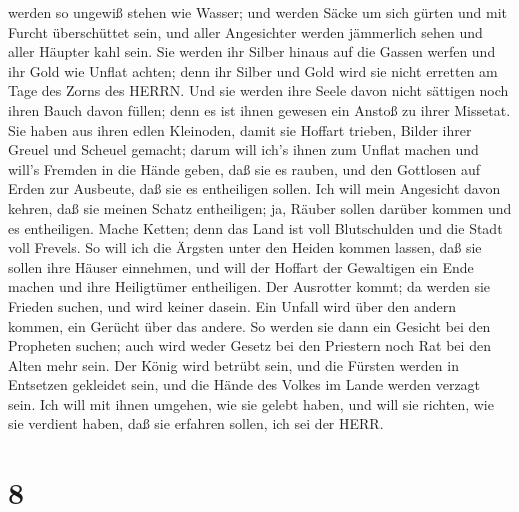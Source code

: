 werden so ungewiß stehen wie Wasser;  und werden Säcke um
sich gürten und mit Furcht überschüttet sein, und aller Angesichter
werden jämmerlich sehen und aller Häupter kahl sein.  Sie
werden ihr Silber hinaus auf die Gassen werfen und ihr Gold wie Unflat
achten; denn ihr Silber und Gold wird sie nicht erretten am Tage des
Zorns des HERRN. Und sie werden ihre Seele davon nicht sättigen noch
ihren Bauch davon füllen; denn es ist ihnen gewesen ein Anstoß zu ihrer
Missetat.  Sie haben aus ihren edlen Kleinoden, damit sie
Hoffart trieben, Bilder ihrer Greuel und Scheuel gemacht; darum will
ich's ihnen zum Unflat machen  und will's Fremden in die
Hände geben, daß sie es rauben, und den Gottlosen auf Erden zur
Ausbeute, daß sie es entheiligen sollen.  Ich will mein
Angesicht davon kehren, daß sie meinen Schatz entheiligen; ja, Räuber
sollen darüber kommen und es entheiligen.  Mache Ketten;
denn das Land ist voll Blutschulden und die Stadt voll Frevels.
 So will ich die Ärgsten unter den Heiden kommen lassen,
daß sie sollen ihre Häuser einnehmen, und will der Hoffart der
Gewaltigen ein Ende machen und ihre Heiligtümer entheiligen.
 Der Ausrotter kommt; da werden sie Frieden suchen, und
wird keiner dasein.  Ein Unfall wird über den andern
kommen, ein Gerücht über das andere. So werden sie dann ein Gesicht bei
den Propheten suchen; auch wird weder Gesetz bei den Priestern noch Rat
bei den Alten mehr sein.  Der König wird betrübt sein, und
die Fürsten werden in Entsetzen gekleidet sein, und die Hände des Volkes
im Lande werden verzagt sein. Ich will mit ihnen umgehen, wie sie gelebt
haben, und will sie richten, wie sie verdient haben, daß sie erfahren
sollen, ich sei der HERR.

\hypertarget{section-7}{%
\section{8}\label{section-7}}

